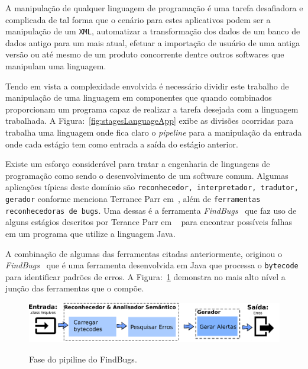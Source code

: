 A manipulaç\~{a}o de qualquer linguagem de programaç\~{a}o \'{e} uma tarefa desafiadora e complicada de tal forma que o cen\'{a}rio para estes aplicativos podem ser a manipulaç\~{a}o de um \texttt{XML}, automatizar a transformaç\~{a}o dos dados de um banco de dados antigo para um mais atual, efetuar a importaç\~{a}o de usu\'{a}rio de uma antiga vers\~{a}o ou at\'{e} mesmo de um produto concorrente dentre outros softwares que manipulam uma linguagem.

Tendo em vista a complexidade envolvida \'{e} necess\'{a}rio dividir este trabalho de manipulaç\~{a}o de uma linguagem em componentes que quando combinados proporcionam um programa capaz de realizar a tarefa desejada com a linguagem trabalhada. A Figura:~\ref{fig:stagesLanguageApp} exibe as divis\~{o}es ocorridas para trabalha uma linguagem onde fica claro o \textit{pipeline} para a manipulaç\~{a}o da entrada onde cada est\'{a}gio tem como entrada a sa\'{i}da do est\'{a}gio anterior.

Existe um esforço consider\'{a}vel para tratar a engenharia de linguagens de programaç\~{a}o como sendo o desenvolvimento de um software comum. Algumas aplicaç\~{o}es t\'{i}picas deste dom\'{i}nio s\~{a}o \texttt{reconhecedor, interpretador, tradutor, gerador} conforme menciona Terrance Parr em~\cite{Parr:2009:LIP:1823613},  al\'{e}m de \texttt{ferramentas reconhecedoras de bugs}. Uma dessas \'{e} a ferramenta \textit{FindBugs}~\cite{FindBugs} que faz uso de alguns est\'{a}gios descritos por Terance Parr em ~\cite{Parr:2009:LIP:1823613} para encontrar poss\'{i}veis falhas em um programa que utilize a linguagem Java.

A combinaç\~{a}o de algumas das ferramentas citadas anteriormente, originou o \textit{FindBugs}~\cite{FindBugs} que \'{e} uma ferramenta desenvolvida em Java que processa o \texttt{bytecode} para identificar padr\~{o}es de erros. A Figura:~\ref{fig:findBugs} demonstra no mais alto n\'{i}vel a junç\~{a}o das ferramentas que o comp\~{o}e. 

\begin{figure}[h]
	\center
	\includegraphics[scale=0.9]{Imagens/pipelineFindbugs}
	\label{fig:findBugs}
	\caption{Fase do pipiline do FindBugs.}
\end{figure}

